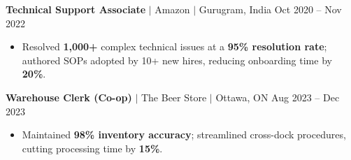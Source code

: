 \documentclass[11pt,a4paper]{article}
\begin{document}
\textbf{Technical Support Associate} $|$ Amazon $|$ Gurugram, India \hfill Oct 2020 -- Nov 2022
\begin{itemize}
    \item Resolved \textbf{1,000+} complex technical issues at a \textbf{95\% resolution rate}; authored SOPs adopted by 10+ new hires, reducing onboarding time by \textbf{20\%}.
\end{itemize}

\vspace{4pt}

\textbf{Warehouse Clerk (Co-op)} $|$ The Beer Store $|$ Ottawa, ON \hfill Aug 2023 -- Dec 2023
\begin{itemize}
    \item Maintained \textbf{98\% inventory accuracy}; streamlined cross-dock procedures, cutting processing time by \textbf{15\%}.
\end{itemize}
\end{document}

